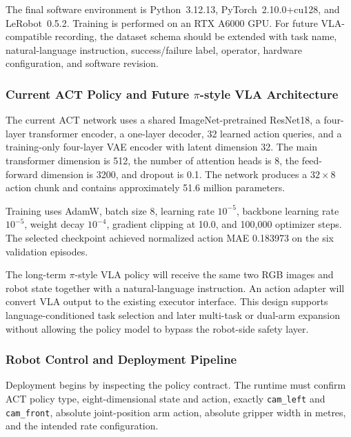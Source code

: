 \documentclass[12pt, letterpaper]{article}
\newcommand{\pistyle}{$\pi$-style}
\begin{document}
The final software environment is Python~3.12.13, PyTorch~2.10.0+cu128, and LeRobot~0.5.2. Training is performed on an RTX A6000 GPU. For future VLA-compatible recording, the dataset schema should be extended with task name, natural-language instruction, success/failure label, operator, hardware configuration, and software revision.

\subsubsection{Current ACT Policy and Future \pistyle{} VLA Architecture}

The current ACT network uses a shared ImageNet-pretrained ResNet18, a four-layer transformer encoder, a one-layer decoder, 32 learned action queries, and a training-only four-layer VAE encoder with latent dimension 32. The main transformer dimension is 512, the number of attention heads is 8, the feed-forward dimension is 3200, and dropout is 0.1. The network produces a \(32\times8\) action chunk and contains approximately 51.6 million parameters.

Training uses AdamW, batch size 8, learning rate \(10^{-5}\), backbone learning rate \(10^{-5}\), weight decay \(10^{-4}\), gradient clipping at 10.0, and 100,000 optimizer steps. The selected checkpoint achieved normalized action MAE 0.183973 on the six validation episodes.

The long-term \pistyle{} VLA policy will receive the same two RGB images and robot state together with a natural-language instruction. An action adapter will convert VLA output to the existing executor interface. This design supports language-conditioned task selection and later multi-task or dual-arm expansion without allowing the policy model to bypass the robot-side safety layer.

\subsubsection{Robot Control and Deployment Pipeline}

Deployment begins by inspecting the policy contract. The runtime must confirm ACT policy type, eight-dimensional state and action, exactly \texttt{cam\_left} and \texttt{cam\_front}, absolute joint-position arm action, absolute gripper width in metres, and the intended rate configuration.
\end{document}
